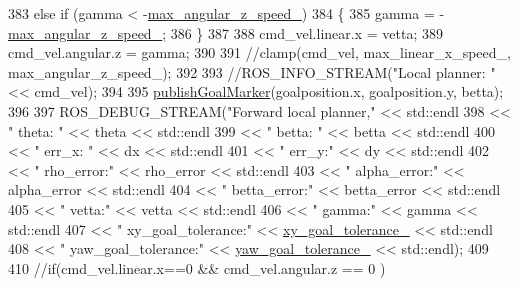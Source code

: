 \begin{DoxyCode}
{383     \textcolor{keywordflow}{else} \textcolor{keywordflow}{if} (gamma < -\hyperlink{classcl__move__base__z_1_1forward__local__planner_1_1ForwardLocalPlanner_a198154e40443d46292d8eba1d81ad34f}{max\_angular\_z\_speed\_})
384     \{
385         gamma = -\hyperlink{classcl__move__base__z_1_1forward__local__planner_1_1ForwardLocalPlanner_a198154e40443d46292d8eba1d81ad34f}{max\_angular\_z\_speed\_};
386     \}
387 
388     cmd\_vel.linear.x = vetta;
389     cmd\_vel.angular.z = gamma;
390 
391     \textcolor{comment}{//clamp(cmd\_vel, max\_linear\_x\_speed\_, max\_angular\_z\_speed\_);}
392 
393     \textcolor{comment}{//ROS\_INFO\_STREAM("Local planner: "<< cmd\_vel);}
394 
395     \hyperlink{classcl__move__base__z_1_1forward__local__planner_1_1ForwardLocalPlanner_ae2ef5a1d00495eb7a6c22ec35ab8baf2}{publishGoalMarker}(goalposition.x, goalposition.y, betta);
396 
397     ROS\_DEBUG\_STREAM(\textcolor{stringliteral}{"Forward local planner,"} << std::endl
398                                               << \textcolor{stringliteral}{" theta: "} << theta << std::endl
399                                               << \textcolor{stringliteral}{" betta: "} << betta << std::endl
400                                               << \textcolor{stringliteral}{" err\_x: "} << dx << std::endl
401                                               << \textcolor{stringliteral}{" err\_y:"} << dy << std::endl
402                                               << \textcolor{stringliteral}{" rho\_error:"} << rho\_error << std::endl
403                                               << \textcolor{stringliteral}{" alpha\_error:"} << alpha\_error << std::endl
404                                               << \textcolor{stringliteral}{" betta\_error:"} << betta\_error << std::endl
405                                               << \textcolor{stringliteral}{" vetta:"} << vetta << std::endl
406                                               << \textcolor{stringliteral}{" gamma:"} << gamma << std::endl
407                                               << \textcolor{stringliteral}{" xy\_goal\_tolerance:"} << 
      \hyperlink{classcl__move__base__z_1_1forward__local__planner_1_1ForwardLocalPlanner_acd2ed91ee166f03faeeb9d6a4b91084b}{xy\_goal\_tolerance\_} << std::endl
408                                               << \textcolor{stringliteral}{" yaw\_goal\_tolerance:"} << 
      \hyperlink{classcl__move__base__z_1_1forward__local__planner_1_1ForwardLocalPlanner_a7ea1ca266850c7b847a2355f489e6041}{yaw\_goal\_tolerance\_} << std::endl);
409 
410     \textcolor{comment}{//if(cmd\_vel.linear.x==0 && cmd\_vel.angular.z == 0 )}
}
\end{DoxyCode}
